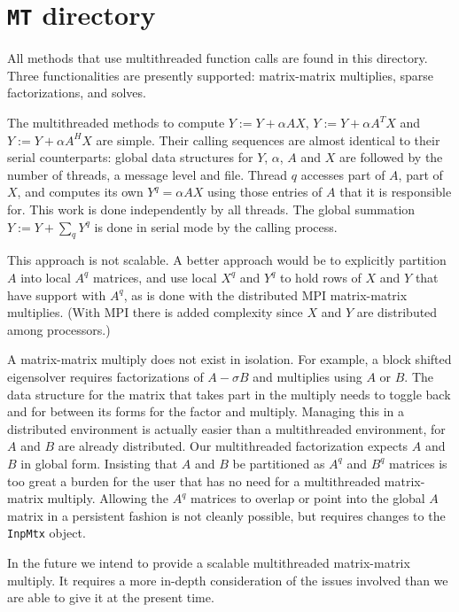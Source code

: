 \chapter{{\tt MT} directory}
\label{chapter:MT}
\par
All methods that use multithreaded function calls 
are found in this directory.
Three functionalities are presently supported:
matrix-matrix multiplies, sparse factorizations, and solves.
\par
The multithreaded methods to compute $Y := Y + \alpha A X$,
$Y := Y + \alpha A^T X$ and $Y := Y + \alpha A^H X$
are simple.
Their calling sequences are almost identical to their 
serial counterparts: global data structures for $Y$,
$\alpha$, $A$ and $X$ are followed by the number of threads,
a message level and file.
Thread $q$ accesses part of $A$, part of $X$, and computes its own
$Y^q = \alpha A X$ using those entries of $A$ that it is
responsible for.
This work is done independently by all threads.
The global summation $Y := Y + \sum_q Y^q$ is done in serial mode
by the calling process.
\par
This approach is not scalable.
A better approach would be to explicitly partition $A$ into local
$A^q$ matrices, and use local $X^q$ and $Y^q$ to hold rows of $X$
and $Y$ that have support with $A^q$, as is done with the
distributed MPI matrix-matrix multiplies.
(With MPI there is added complexity since $X$ and $Y$ are distributed
among processors.)
\par
A matrix-matrix multiply does not exist in isolation.
For example, a block shifted eigensolver requires factorizations of
$A - \sigma B$ and multiplies using $A$ or $B$.
The data structure for the matrix that takes part in the multiply
needs to toggle back and for between its forms for the factor and
multiply.
Managing this in a distributed environment is actually easier than
a multithreaded environment, for $A$ and $B$ are already
distributed.
Our multithreaded factorization expects $A$ and $B$ in global form.
Insisting that $A$ and $B$ be partitioned as $A^q$ and $B^q$
matrices is too great a burden for the user that has no need for a
multithreaded matrix-matrix multiply.
Allowing the $A^q$ matrices to overlap or point into the global $A$
matrix in a persistent fashion is not cleanly possible, but
requires changes to the {\tt InpMtx} object.
\par
In the future we intend to provide a scalable multithreaded
matrix-matrix multiply.
It requires a more in-depth consideration of the issues involved
than we are able to give it at the present time.
